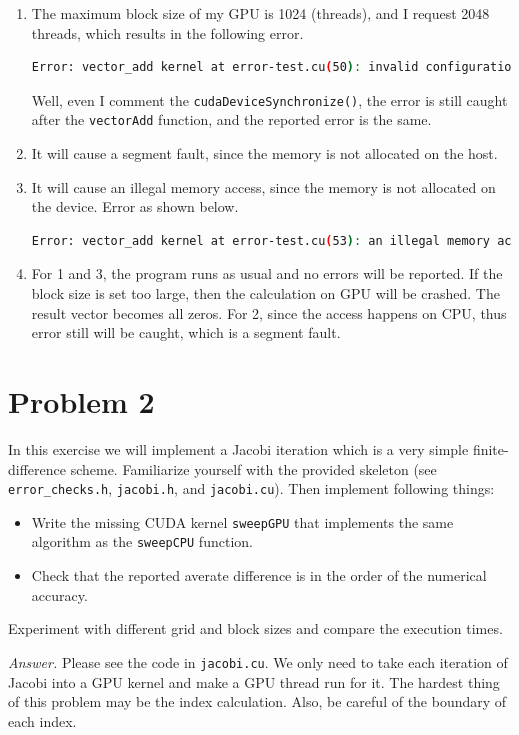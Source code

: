 \documentclass[english]{thesis}
\begin{document}
\begin{enumerate}
	\item The maximum block size of my GPU is 1024 (threads), and I request 2048 threads, which results in the following error.
\begin{lstlisting}[language=bash]
Error: vector_add kernel at error-test.cu(50): invalid configuration argument
\end{lstlisting}
	Well, even I comment the \verb'cudaDeviceSynchronize()', the error is still caught after the \verb'vectorAdd' function, and the reported error is the same.
	\item It will cause a segment fault, since the memory is not allocated on the host.
	\item It will cause an illegal memory access, since the memory is not allocated on the device. Error as shown below.
\begin{lstlisting}[language=bash]
Error: vector_add kernel at error-test.cu(53): an illegal memory access was encountered
\end{lstlisting}
	\item For 1 and 3, the program runs as usual and no errors will be reported.
	If the block size is set too large, then the calculation on GPU will be crashed.
	The result vector becomes all zeros.
	For 2, since the access happens on CPU, thus error still will be caught, which is a segment fault.
\end{enumerate}

\section{Problem 2}
In this exercise we will implement a Jacobi iteration which is a very simple finite-difference scheme.
Familiarize yourself with the provided skeleton (see \verb'error_checks.h', \verb'jacobi.h', and \verb'jacobi.cu').
Then implement following things:
\begin{itemize}
\item Write the missing CUDA kernel \verb'sweepGPU' that implements the same algorithm as the \verb'sweepCPU' function.
\item Check that the reported averate difference is in the order of the numerical accuracy.
\end{itemize}

Experiment with different grid and block sizes and compare the execution times.

\bigskip
\textit{Answer.} Please see the code in \verb'jacobi.cu'.
We only need to take each iteration of Jacobi into a GPU kernel and make a GPU thread run for it.
The hardest thing of this problem may be the index calculation.
Also, be careful of the boundary of each index.
\end{document}
